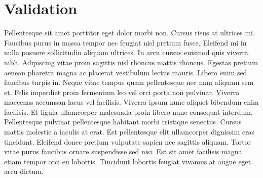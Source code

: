 
\chapter{Validation}
\label{validation}

Pellentesque sit amet porttitor eget dolor morbi non. Cursus risus at ultrices mi. Faucibus purus in massa tempor nec feugiat nisl pretium fusce. Eleifend mi in nulla posuere sollicitudin aliquam ultrices. In arcu cursus euismod quis viverra nibh. Adipiscing vitae proin sagittis nisl rhoncus mattis rhoncus. Egestas pretium aenean pharetra magna ac placerat vestibulum lectus mauris. Libero enim sed faucibus turpis in. Neque vitae tempus quam pellentesque nec nam aliquam sem et. Felis imperdiet proin fermentum leo vel orci porta non pulvinar. Viverra maecenas accumsan lacus vel facilisis. Viverra ipsum nunc aliquet bibendum enim facilisis. Et ligula ullamcorper malesuada proin libero nunc consequat interdum. Pellentesque pulvinar pellentesque habitant morbi tristique senectus. Cursus mattis molestie a iaculis at erat. Est pellentesque elit ullamcorper dignissim cras tincidunt. Eleifend donec pretium vulputate sapien nec sagittis aliquam. Tortor vitae purus faucibus ornare suspendisse sed nisi. Est sit amet facilisis magna etiam tempor orci eu lobortis. Tincidunt lobortis feugiat vivamus at augue eget arcu dictum.